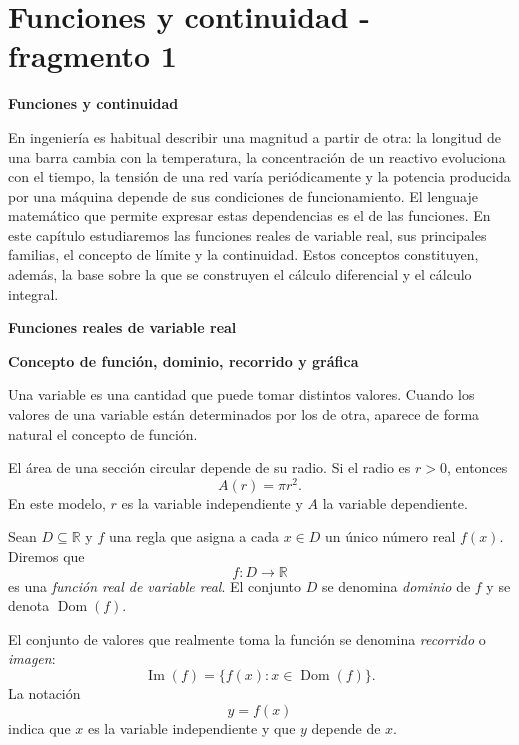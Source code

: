 
\section{Funciones y continuidad - fragmento 1}
\textbf{Funciones y continuidad}

En ingeniería es habitual describir una magnitud a partir de otra: la longitud de una barra cambia con la temperatura, la concentración de un reactivo evoluciona con el tiempo, la tensión de una red varía periódicamente y la potencia producida por una máquina depende de sus condiciones de funcionamiento. El lenguaje matemático que permite expresar estas dependencias es el de las funciones. En este capítulo estudiaremos las funciones reales de variable real, sus principales familias, el concepto de límite y la continuidad. Estos conceptos constituyen, además, la base sobre la que se construyen el cálculo diferencial y el cálculo integral.

\textbf{Funciones reales de variable real}

\textbf{Concepto de función, dominio, recorrido y gráfica}

Una variable es una cantidad que puede tomar distintos valores. Cuando los valores de una variable están determinados por los de otra, aparece de forma natural el concepto de función.

\begin{example}
El área de una sección circular depende de su radio. Si el radio es $r>0$, entonces
\[
A(r)=\pi r^2.
\]
En este modelo, $r$ es la variable independiente y $A$ la variable dependiente.
\end{example}

\begin{definition}
Sean $D\subseteq\mathbb{R}$ y $f$ una regla que asigna a cada $x\in D$ un único número real $f(x)$. Diremos que
\[
f:D\longrightarrow\mathbb{R}
\]
es una \emph{función real de variable real}. El conjunto $D$ se denomina \emph{dominio} de $f$ y se denota $\operatorname{Dom}(f)$.
\end{definition}

El conjunto de valores que realmente toma la función se denomina \emph{recorrido} o \emph{imagen}:
\[
\operatorname{Im}(f)=\{f(x):x\in\operatorname{Dom}(f)\}.
\]
La notación
\[
y=f(x)
\]
indica que $x$ es la variable independiente y que $y$ depende de $x$.



